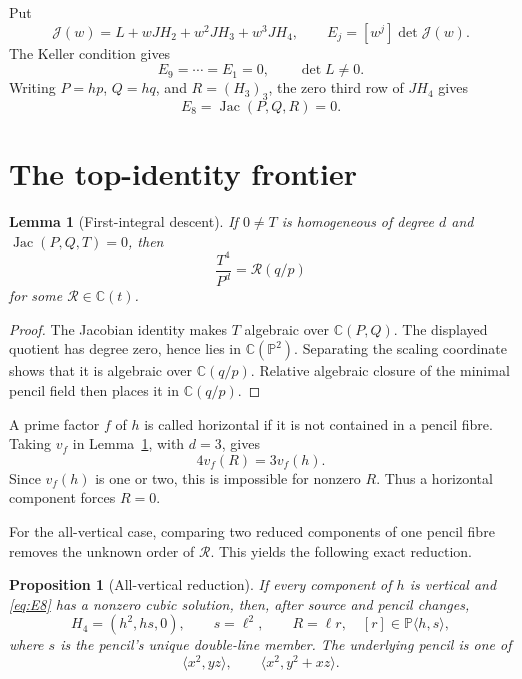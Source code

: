 \documentclass[11pt]{article}
\newtheorem{proposition}[theorem]{Proposition}
\newtheorem{lemma}[theorem]{Lemma}
\theoremstyle{remark}
\newcommand{\C}{\mathbb C}
\newcommand{\PP}{\mathbb P}
\newcommand{\Jac}{\operatorname{Jac}}
\begin{document}
Put
\[
\mathcal J(w)=L+wJH_2+w^2JH_3+w^3JH_4,\qquad
E_j=[w^j]\det\mathcal J(w).
\]
The Keller condition gives
\begin{equation}
E_9=\cdots=E_1=0,\qquad\det L\ne0.                  \label{eq:weighted}
\end{equation}
Writing $P=hp$, $Q=hq$, and $R=(H_3)_3$, the zero third row of $JH_4$
gives
\begin{equation}
E_8=\Jac(P,Q,R)=0.                                  \label{eq:E8}
\end{equation}

\section{The top-identity frontier}

\begin{lemma}[First-integral descent]\label{lem:descent}
If $0\ne T$ is homogeneous of degree $d$ and
$\Jac(P,Q,T)=0$, then
\[
\frac{T^4}{P^d}=\mathcal R(q/p)
\]
for some $\mathcal R\in\C(t)$.
\end{lemma}

\begin{proof}
The Jacobian identity makes $T$ algebraic over $\C(P,Q)$.  The displayed
quotient has degree zero, hence lies in $\C(\PP^2)$.  Separating the scaling
coordinate shows that it is algebraic over $\C(q/p)$.  Relative algebraic
closure of the minimal pencil field then places it in $\C(q/p)$.
\end{proof}

A prime factor $f$ of $h$ is called horizontal if it is not contained in a
pencil fibre.  Taking $v_f$ in Lemma~\ref{lem:descent}, with $d=3$, gives
\[
4v_f(R)=3v_f(h).
\]
Since $v_f(h)$ is one or two, this is impossible for nonzero $R$.  Thus a
horizontal component forces $R=0$.

For the all-vertical case, comparing two reduced components of one pencil
fibre removes the unknown order of $\mathcal R$.  This yields the following
exact reduction.

\begin{proposition}[All-vertical reduction]\label{prop:vertical}
If every component of $h$ is vertical and \eqref{eq:E8} has a nonzero
cubic solution, then, after source and pencil changes,
\begin{equation}
H_4=(h^2,hs,0),\qquad s=\ell^2,\qquad
R=\ell r,\quad [r]\in\PP\langle h,s\rangle,          \label{eq:frontier}
\end{equation}
where $s$ is the pencil's unique double-line member.
The underlying pencil is one of
\[
\langle x^2,yz\rangle,\qquad
\langle x^2,y^2+xz\rangle.
\]
\end{proposition}
\end{document}
